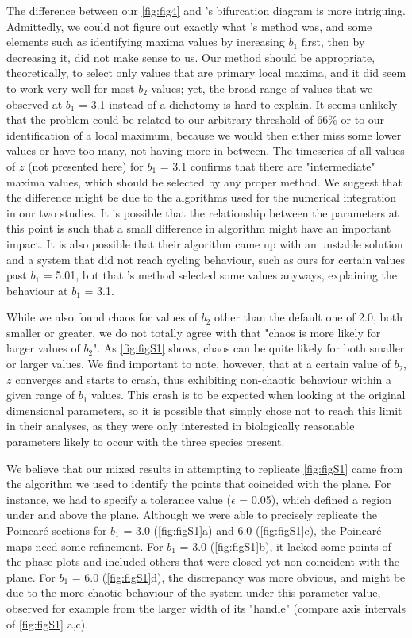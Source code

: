 The difference between our \autoref{fig:fig4} and \citeauthor{hastings1991}'s bifurcation diagram is more
intriguing. Admittedly, we could not figure out exactly what \citeauthor{hastings1991}'s method
was, and some elements such as identifying maxima values by increasing $b_1$ first, then
by decreasing it, did not make sense to us.
Our method should be appropriate, theoretically, to select only values that are primary
local maxima, and it did seem to work very well for most $b_2$ values;
yet, the broad range of values that we observed at $b_1$ = 3.1 instead of a dichotomy is
hard to explain.
It seems unlikely that the problem could be related to our arbitrary threshold of 66\% or
to our identification of a local maximum, because we would then either miss some lower
values or have too many, not having more in between.
The timeseries of all values of $z$ (not presented here) for $b_1$ = 3.1 confirms that
there are "intermediate" maxima values, which should be selected by any proper method.
We suggest that the difference might be due to the algorithms used for the numerical
integration in our two studies.
It is possible that the relationship between the parameters at this point is such that a
small difference in algorithm might have an important impact.
It is also possible that their algorithm came up with an unstable solution and a system
that did not reach cycling behaviour, such as ours for certain values past $b_1$ = 5.01,
but that \citeauthor{hastings1991}'s method selected some values anyways, explaining the behaviour
at $b_1$ = 3.1.

While we also found chaos for values of $b_2$ other than the default one of 2.0, both
smaller or greater, we do not totally agree with \citeauthor{hastings1991} that "chaos is more
likely for larger values of $b_2$". As \autoref{fig:figS1} shows, chaos can be quite likely for both
smaller or larger values.
We find important to note, however, that at a certain value of $b_2$, $z$ converges and
starts to crash, thus exhibiting non-chaotic behaviour within a given range of $b_1$
values. This crash is to be expected when looking at the original dimensional parameters,
so it is possible that \citeauthor{hastings1991} simply chose not to reach this limit in their
analyses, as they were only interested in biologically reasonable parameters likely to
occur with the three species present.

We believe that our mixed results in attempting to replicate \autoref{fig:figS1} came from the
algorithm we used to identify the points that coincided with the plane.
For instance, we had to specify a tolerance value ($\epsilon$ = 0.05), which defined a region
under and above the plane.
Although we were able to precisely replicate the Poincaré sections for $b_1$ = 3.0
(\autoref{fig:figS1}a) and 6.0 (\autoref{fig:figS1}c), the Poincaré maps need some refinement.
For $b_1$ = 3.0 (\autoref{fig:figS1}b), it lacked some points of the phase plots and included
others that were closed yet non-coincident with the plane.
For $b_1$ = 6.0 (\autoref{fig:figS1}d), the discrepancy was more obvious, and might be due to the
more chaotic behaviour of the system under this parameter value, observed for example from the
larger width of its "handle" (compare axis intervals of \autoref{fig:figS1} a,c).

